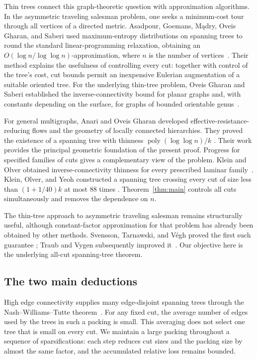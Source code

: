 \documentclass[11pt]{amsart}
\theoremstyle{definition}
\theoremstyle{remark}
\numberwithin{equation}{section}
\begin{document}
Thin trees connect this graph-theoretic question with approximation
algorithms. In the asymmetric traveling salesman problem, one seeks a
minimum-cost tour through all vertices of a directed metric.
Asadpour, Goemans, M\k{a}dry, Oveis Gharan, and Saberi used
maximum-entropy distributions on spanning trees to round the standard
linear-programming relaxation, obtaining an
\(O(\log n/\log\log n)\)-approximation, where \(n\) is the number
of vertices~\cite{AsadpourSODA,Asadpour}.
Their method explains the usefulness of controlling every cut:
together with control of the tree's cost, cut bounds permit an inexpensive
Eulerian augmentation of a suitable oriented tree.
For the underlying thin-tree problem, Oveis Gharan and
Saberi established the inverse-connectivity bound for planar graphs
and, with constants depending on the surface, for graphs of bounded
orientable genus~\cite[Theorem~5.1]{OveisGharanSaberi2011}.

For general multigraphs, Anari and Oveis Gharan developed
effective-resistance-reducing flows and the geometry of locally
connected hierarchies. They proved the existence of a spanning tree
with thinness \(\operatorname{poly}(\log\log n)/k\)
\cite[Corollary~1.8]{AOG}.
Their work provides the principal geometric foundation of the present
proof. Progress for specified families of cuts gives a complementary
view of the problem. Klein and Olver obtained inverse-connectivity
thinness for every prescribed laminar family~\cite{KleinOlver2023}.
Klein, Olver, and Yeoh constructed a spanning tree crossing every cut
of size less than \((1+1/40)k\) at most \(88\) times
\cite[Theorem~1]{KleinOlverYeoh}.
Theorem~\ref{thm:main} controls all cuts simultaneously and removes
the dependence on \(n\).

The thin-tree approach to asymmetric traveling salesman remains
structurally useful, although constant-factor approximation for that
problem has already been obtained by other methods. Svensson,
Tarnawski, and V\'egh proved the first such guarantee
\cite{SvenssonTarnawskiVegh2020}; Traub and Vygen subsequently
improved it~\cite{TraubVygen2022}. Our objective here is the
underlying all-cut spanning-tree theorem.

\subsection*{The two main deductions}

High edge connectivity supplies many edge-disjoint spanning trees
through the Nash--Williams--Tutte theorem~\cite{NashWilliams,Tutte}.
For any fixed cut, the average number of edges used by the trees in
such a packing is small. This averaging does not select one tree
that is small on every cut. We maintain a large packing throughout
a sequence of sparsifications: each step reduces cut sizes and the
packing size by almost the same factor, and the accumulated relative
loss remains bounded.
\end{document}
